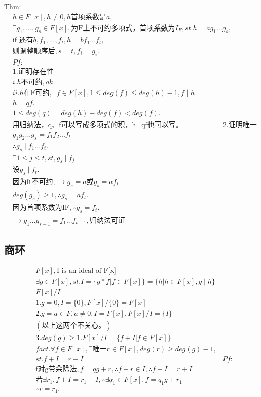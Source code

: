 \documentclass[12pt, a4paper]{article}  %
\begin{document}
Thm:\\
\begin{align}
    &h\in F[x],h\neq 0,h\text{首项系数是}a,\\
    &\exists g_1,...,g_s\in F[x],\text{为F上不可约多项式，首项系数为}I_F,st. h=ag_1...g_s,\\
    &\text{if 还有}b,f_1,...,f_t,h=bf_1...f_t,\\
    &\text{则调整顺序后},s=t,f_i=g_i.
    & \\
    &Pf:\\
    & 1.\text{证明存在性}\\
    &i.h\text{不可约},ok\\
    &ii.h\text{在F可约},\exists f\in F[x],1\leqslant deg(f)\leqslant deg(h)-1,f\mid h\\
    &h=qf.\\
    &1\leqslant deg(q)=deg(h)-deg(f)<deg(f).\\
    &\text{用归纳法，q、f可以写成多项式的积，h=qf也可以写。}
    &2.\text{证明唯一性}\\
    &g_1g_2...g_s=f_1f_2...f_t\\
    &\therefore g_s\mid f_1...f_t.\\
    &\exists 1\leqslant j\leqslant t,st,g_s\mid f_j\\
    &\text{设}g_s\mid f_t.\\
    &\text{因为ft不可约},\rightarrow g_s=a\text{或}g_s=af_t\\
    &deg(g_s)\geqslant 1,\therefore g_s=af_t.\\
    &\text{因为首项系数为IF},\therefore g_s=f_t.\\
    &\rightarrow g_1...g_{s-1}=f_1...f_{t-1},\text{归纳法可证}
\end{align}

\subsection{商环}

\begin{align}
    &F[x],\text{I is an ideal of F[x]}\\
    &\exists g\in F[x],st. I=\{g*f|f\in F[x]\}=\{h|h\in F[x],g\mid h\}\\
    &F[x]/I\\
    &1.g=0,I=\{0\},F[x]/\{0\}=F[x]\\
    &2.g=a\in F,a\neq 0,I=F[x],F[x]/I=\{I\}\\
    &(\text{以上这两个不关心。})\\
    &3.deg(g)\geqslant 1.F[x]/I=\{f+I|f\in F[x]\}\\
    &fact.\forall f\in F[x],\exists \text{唯一}r\in F[x],deg(r)\geqslant deg(g)-1,\\
    &st.f+I=r+I
    &Pf:\\
    &\text{f对g带余除法},f=qg+r,\therefore f-r\in I,\therefore f+I=r+I\\
    &\text{若}\exists r_1,f+I=r_1+I,\therefore \exists q_1\in F[x],f=q_1g+r_1\\
    &\therefore r=r_1.
\end{align}
\end{document}
